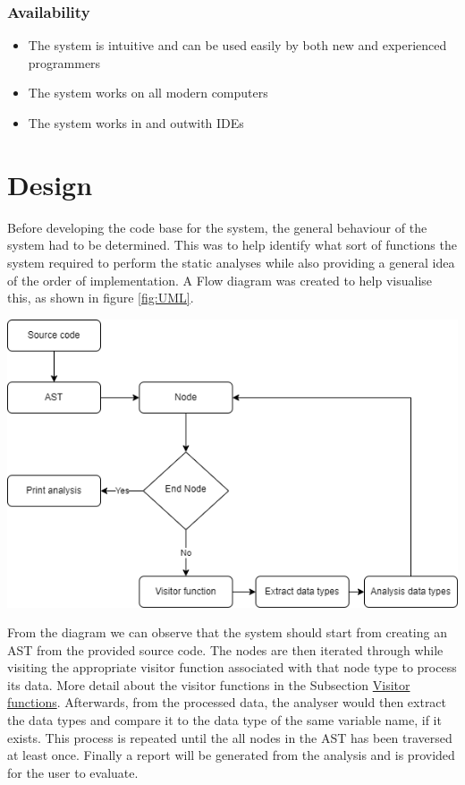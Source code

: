 \documentclass{l4proj}
\begin{document}
\subsection{Availability}
\begin{itemize}
    \item The system is intuitive and can be used easily by both new and experienced programmers
    \item The system works on all modern computers
    \item The system works in and outwith IDEs
\end{itemize}

\chapter{Design}

Before developing the code base for the system, the general behaviour of the system had to be determined. This was to help identify what sort of functions the system required to perform the static analyses while also providing a general idea of the order of implementation. A Flow diagram was created to help visualise this, as shown in figure \ref{fig:UML}.

\begin{center}
    \includegraphics[width=\textwidth]{images/UML_activity.png}
    \label{fig:UML} 
\end{center}

From the diagram we can observe that the system should start from creating an AST from the provided source code. The nodes are then iterated through while visiting the appropriate visitor function associated with that node type to process its data. More detail about the visitor functions in the Subsection \hyperref[sec:visit]{Visitor functions}. Afterwards, from the processed data, the analyser would then extract the data types and compare it to the data type of the same variable name, if it exists. This process is repeated until the all nodes in the AST has been traversed at least once. Finally a report will be generated from the analysis and is provided for the user to evaluate.
\end{document}
